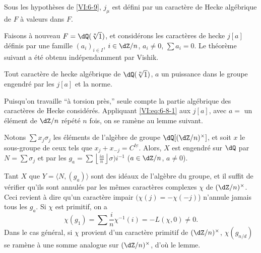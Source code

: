 \begin{proposition_}\label{VI:6-10}
Sous les hypoth\`eses de \ref{VI:6-9}, $j_\mu$ est d\'efini par un caract\`ere 
de Hecke alg\'ebrique de $F$ \`a valeurs dans $F$. 
\end{proposition_}

Faisons \`a nouveau $F=\dQ(\sqrt[n]{1})$, et consid\'erons les caract\`eres de 
hecke $j[a]$ d\'efinis par une famille $(a_i)_{i\in I}$, $i\in \dZ/n$, 
$a_i\ne 0$, $\sum a_i=0$. Le th\'eor\`eme suivant a \'et\'e obtenu 
ind\'ependamment par Vishik. 





\begin{theorem_}\label{VI:6-11}
Tout caract\`ere de hecke alg\'ebrique de $\dQ(\sqrt[n]{1})$, $a$ un puissance 
dans le groupe engendr\'e par les $j[a]$ et la norme. 
\end{theorem_}

Puisqu'on travaille ``\`a torsion pr\`es,'' seule compte la partie alg\'ebrique 
des caract\`eres de Hecke consid\'er\'es. Appliquant \eqref{VI:eq:6-8-1} aux 
$j[a]$, avec $a=$ un \'el\'ement de $\dZ/n$ r\'ep\'et\'e $n$ fois, on se 
ram\`ene au lemme suivant.





\begin{lemma_}\label{VI:6-12}
Notons $\sum x_j \sigma_j$ les \'el\'ements de l'alg\`ebre de groupe 
$\dQ[(\dZ/n)^\times]$, et soit $x$ le sous-groupe de ceux tels que 
$x_j+x_{-j}=C^{\underline{t e}}$. Alors, $X$ est engendr\'e sur $\dQ$ par 
$N=\sum \sigma_j$ et par les 
$g_a=\sum \left\lfloor \frac{i a}{n}\right\rfloor \sigma)i^{-1}$ 
($a\in \dZ/n$, $a\ne 0$). 
\end{lemma_}

Tant $X$ que $Y=\langle N,(g_a)\rangle$ sont des id\'eaux de l'alg\`ebre du 
groupe, et il suffit de v\'erifier qu'ils sont annul\'es par les m\^emes 
caract\`eres complexes $\chi$ de $(\dZ/n)^\times$. Ceci revient \`a dire qu'un 
caract\`ere impair $(\chi(j)=-\chi(-j)$) n'annule jamais tous les $g_a$. Si 
$\chi$ est primitif, on a 
\[
  \chi(g_1) = \sum \frac i n \chi^{-1}(i) = -L(\chi,0)\ne 0 \text{.} 
\]
Dans le cas g\'en\'eral, si $\chi$ provient d'un caract\`ere primitif de 
$(\dZ/n)^\times$, $\chi(g_{n/d})$ se ram\`ene \`a une somme analogue sur 
$(\dZ/n)^\times$, d'o\`u le lemme. 










